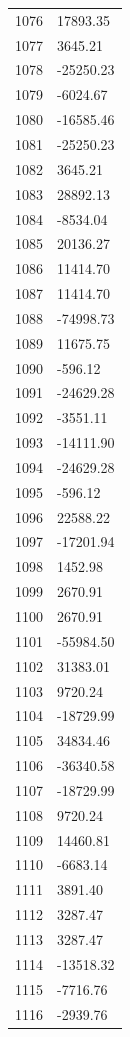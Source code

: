 \documentclass[a4paper,11pt]{article}
\begin{document}
\begin{center}
\begin{longtable}{|R{1.5cm}|R{2.6cm}|}
 1076 &     17893.35 \\
 1077 &      3645.21 \\
 1078 &    -25250.23 \\
 1079 &     -6024.67 \\
 1080 &    -16585.46 \\
 1081 &    -25250.23 \\
 1082 &      3645.21 \\
 1083 &     28892.13 \\
 1084 &     -8534.04 \\
 1085 &     20136.27 \\
 1086 &     11414.70 \\
 1087 &     11414.70 \\
 1088 &    -74998.73 \\
 1089 &     11675.75 \\
 1090 &      -596.12 \\
 1091 &    -24629.28 \\
 1092 &     -3551.11 \\
 1093 &    -14111.90 \\
 1094 &    -24629.28 \\
 1095 &      -596.12 \\
 1096 &     22588.22 \\
 1097 &    -17201.94 \\
 1098 &      1452.98 \\
 1099 &      2670.91 \\
 1100 &      2670.91 \\
 1101 &    -55984.50 \\
 1102 &     31383.01 \\
 1103 &      9720.24 \\
 1104 &    -18729.99 \\
 1105 &     34834.46 \\
 1106 &    -36340.58 \\
 1107 &    -18729.99 \\
 1108 &      9720.24 \\
 1109 &     14460.81 \\
 1110 &     -6683.14 \\
 1111 &      3891.40 \\
 1112 &      3287.47 \\
 1113 &      3287.47 \\
 1114 &    -13518.32 \\
 1115 &     -7716.76 \\
 1116 &     -2939.76 \\

\end{longtable}
\end{center}
\end{document}
